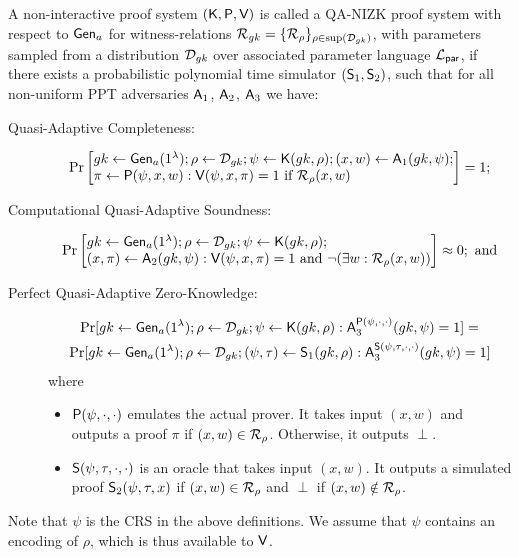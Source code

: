 \begin{definition}
A non-interactive proof system  $(\mathsf{K},\mathsf{P},\mathsf{V})$ is called a QA-NIZK proof system with respect to $\mathsf{Gen}_a$ for witness-relations
$\mathcal{R}_{gk} = \{\mathcal{R}_\rho\}_{\rho \in \mathrm{sup}(\mathcal{D}_{gk})}$,
with parameters sampled from a distribution $\mathcal{D}_{gk}$ over associated parameter language
$\mathcal{L}_\mathsf{par}$, if there exists a probabilistic polynomial time simulator $(\mathsf{S}_1, \mathsf{S}_2)$,
such that for all non-uniform PPT adversaries $\mathsf{A}_1$, $\mathsf{A}_2$, $\mathsf{A}_3$ we have:

\begin{description}
\item[Quasi-Adaptive Completeness:]
$$\Pr\begin{bmatrix*}[l]
    \gk \gets \G_a(1^\lambda);
    \rho \gets \dist_\gk;
    \psi \gets \algK(\gk, \rho);
    (x, w) \gets \advA_1(\gk, \psi);\\
    \pi \gets \algP(\psi, x, w) :
        \algV(\psi, x, \pi) = 1 \text{ if } \R_\rho(x, w)
\end{bmatrix*} = 1;$$
\item[Computational Quasi-Adaptive Soundness:]
$$\Pr\begin{bmatrix*}[l]
    \gk \gets \G_a(1^\lambda);
    \rho \gets \dist_\gk;
    \psi \gets \algK(\gk, \rho); \\
    (x, \pi) \gets \advA_2(\gk, \psi) :
        \algV(\psi, x, \pi) = 1 \text{ and } \neg (\exists w : \R_\rho(x, w))
\end{bmatrix*} \approx 0;\text{ and}$$ 
\item[Perfect Quasi-Adaptive Zero-Knowledge:]
\begin{eqnarray*}
\Pr[
    {gk} \gets \mathsf{Gen}_a(1^\lambda);
    \rho \gets \mathcal{D}_{gk};
    \psi \gets \mathsf{K}({gk}, \rho):
        \mathsf{A}_3^{\mathsf{P}(\psi,\cdot, \cdot)}({gk},\psi) = 1]
=\;\;\;\\
\Pr[
    {gk} \gets \mathsf{Gen}_a(1^\lambda);
    \rho \gets \mathcal{D}_{gk};
    (\psi,\tau) \gets \mathsf{S}_1({gk}, \rho):
        \mathsf{A}_3^{\mathsf{S}(\psi,\tau,\cdot,\cdot)}({gk},\psi)=1]
\end{eqnarray*}
where
\begin{itemize}
\item $\mathsf{P}(\psi, \cdot, \cdot)$ emulates the actual prover. It takes input $(x,w)$ and outputs a 
proof $\pi$ if $(x,w)\in\mathcal{R}_\rho$. Otherwise, it outputs $\perp$.
\item $\mathsf{S}(\psi,\tau, \cdot, \cdot)$ is an oracle that takes input $(x,w)$. It outputs a simulated proof
$\mathsf{S}_2(\psi,\tau, x)$ if $(x, w) \in \mathcal{R}_\rho$ and $\perp$ if $(x, w) \notin \mathcal{R}_\rho$.
\end{itemize}
\end{description}
Note that $\psi$ is the CRS in the above definitions.
We assume that $\psi$ contains an encoding of $\rho$, which is thus available to $\mathsf{V}$.
\end{definition}

